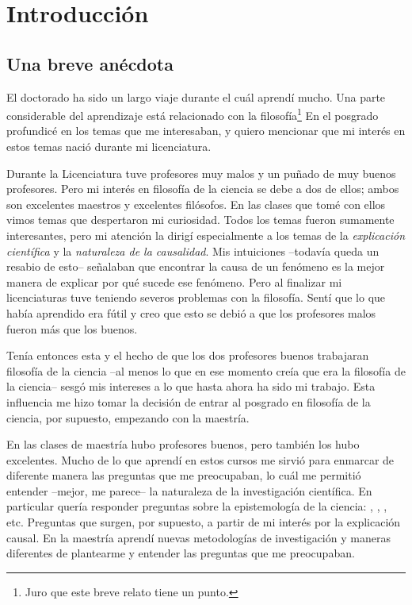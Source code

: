 
\chapter{Introducción}\label{ch:introduction}

\section{Una breve anécdota}

\noindent El doctorado ha sido un largo viaje durante el cuál aprendí mucho.
Una parte considerable del aprendizaje está relacionado con la filosofía\footnote{Juro que este breve relato tiene un punto.}
En el posgrado profundicé en los temas que me interesaban, y quiero mencionar que mi interés en estos temas nació durante mi licenciatura.

Durante la Licenciatura tuve profesores muy malos y un puñado de muy buenos profesores.
Pero mi interés en filosofía de la ciencia se debe a dos de ellos; ambos son excelentes maestros y excelentes filósofos.
En las clases que tomé con ellos vimos temas que despertaron mi curiosidad.
Todos los temas fueron sumamente interesantes, pero mi atención la dirigí especialmente a los temas de la \emph{explicación científica} y la \emph{naturaleza de la causalidad}.
Mis intuiciones --todavía queda un resabio de esto-- señalaban que encontrar la causa de un fenómeno es la mejor manera de explicar por qué sucede ese fenómeno.
Pero al finalizar mi licenciaturas tuve teniendo severos problemas con la filosofía.
Sentí que lo que había aprendido era fútil y creo que esto se debió a que los profesores malos fueron más que los buenos.

Tenía entonces esta  y el hecho de que los dos profesores buenos trabajaran filosofía de la ciencia --al menos lo que en ese momento creía que era la filosofía de la ciencia-- sesgó mis intereses a lo que hasta ahora ha sido mi trabajo.
Esta influencia me hizo tomar la decisión de entrar al posgrado en filosofía de la ciencia, por supuesto, empezando con la maestría.

En las clases de maestría hubo profesores buenos, pero también los hubo excelentes.
Mucho de lo que aprendí en estos cursos me sirvió para enmarcar de diferente manera las preguntas que me preocupaban, lo cuál me permitió entender --mejor, me parece-- la naturaleza de la investigación científica.
En particular quería responder preguntas sobre la epistemología de la ciencia: , , , etc.
Preguntas que surgen, por supuesto, a partir de mi interés por la explicación causal.
En la maestría aprendí nuevas metodologías de investigación y maneras diferentes de plantearme y entender las preguntas que me preocupaban.


